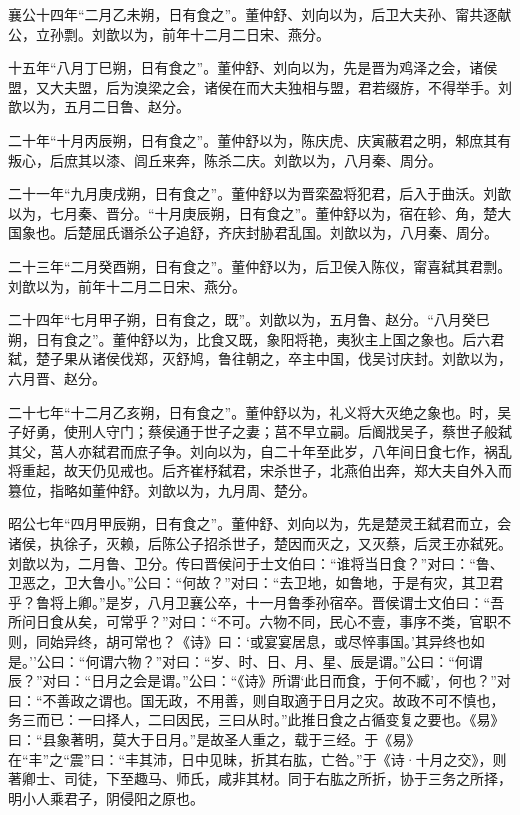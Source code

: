 \documentclass[]{article}
\begin{document}
襄公十四年``二月乙未朔，日有食之''。董仲舒、刘向以为，后卫大夫孙、甯共逐献公，立孙剽。刘歆以为，前年十二月二日宋、燕分。

十五年``八月丁巳朔，日有食之''。董仲舒、刘向以为，先是晋为鸡泽之会，诸侯盟，又大夫盟，后为溴梁之会，诸侯在而大夫独相与盟，君若缀斿，不得举手。刘歆以为，五月二日鲁、赵分。

二十年``十月丙辰朔，日有食之''。董仲舒以为，陈庆虎、庆寅蔽君之明，邾庶其有叛心，后庶其以漆、闾丘来奔，陈杀二庆。刘歆以为，八月秦、周分。

二十一年``九月庚戌朔，日有食之''。董仲舒以为晋栾盈将犯君，后入于曲沃。刘歆以为，七月秦、晋分。``十月庚辰朔，日有食之''。董仲舒以为，宿在轸、角，楚大国象也。后楚屈氏谮杀公子追舒，齐庆封胁君乱国。刘歆以为，八月秦、周分。

二十三年``二月癸酉朔，日有食之''。董仲舒以为，后卫侯入陈仪，甯喜弑其君剽。刘歆以为，前年十二月二日宋、燕分。

二十四年``七月甲子朔，日有食之，既''。刘歆以为，五月鲁、赵分。``八月癸巳朔，日有食之''。董仲舒以为，比食又既，象阳将艳，夷狄主上国之象也。后六君弑，楚子果从诸侯伐郑，灭舒鸠，鲁往朝之，卒主中国，伐吴讨庆封。刘歆以为，六月晋、赵分。

二十七年``十二月乙亥朔，日有食之''。董仲舒以为，礼义将大灭绝之象也。时，吴子好勇，使刑人守门；蔡侯通于世子之妻；莒不早立嗣。后阍戕吴子，蔡世子般弑其父，莒人亦弑君而庶子争。刘向以为，自二十年至此岁，八年间日食七作，祸乱将重起，故天仍见戒也。后齐崔杼弑君，宋杀世子，北燕伯出奔，郑大夫自外入而篡位，指略如董仲舒。刘歆以为，九月周、楚分。

昭公七年``四月甲辰朔，日有食之''。董仲舒、刘向以为，先是楚灵王弑君而立，会诸侯，执徐子，灭赖，后陈公子招杀世子，楚因而灭之，又灭蔡，后灵王亦弑死。刘歆以为，二月鲁、卫分。传曰晋侯问于士文伯曰：``谁将当日食？''对曰：``鲁、卫恶之，卫大鲁小。''公曰：``何故？''对曰：``去卫地，如鲁地，于是有灾，其卫君乎？鲁将上卿。''是岁，八月卫襄公卒，十一月鲁季孙宿卒。晋侯谓士文伯曰：``吾所问日食从矣，可常乎？''对曰：``不可。六物不同，民心不壹，事序不类，官职不则，同始异终，胡可常也？《诗》曰：`或宴宴居息，或尽悴事国。'其异终也如是。''公曰：``何谓六物？''对曰：``岁、时、日、月、星、辰是谓。''公曰：``何谓辰？''对曰：``日月之会是谓。''公曰：``《诗》所谓`此日而食，于何不臧'，何也？''对曰：``不善政之谓也。国无政，不用善，则自取適于日月之灾。故政不可不慎也，务三而已：一曰择人，二曰因民，三曰从时。''此推日食之占循变复之要也。《易》曰：``县象著明，莫大于日月。''是故圣人重之，载于三经。于《易》在``丰''之``震''曰：``丰其沛，日中见昧，折其右肱，亡咎。''于《诗·十月之交》，则著卿士、司徒，下至趣马、师氏，咸非其材。同于右肱之所折，协于三务之所择，明小人乘君子，阴侵阳之原也。
\end{document}

